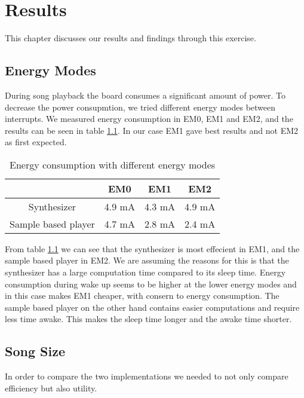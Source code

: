 \chapter{Results}

This chapter discusses our results and findings through this exercise. 


\section{Energy Modes}
\label{sec:energyModeResults}
During song playback the board consumes a significant amount of power. To decrease the power consupmtion, we tried different energy modes between interrupts. We measured energy consumption in EM0, EM1 and EM2, and the results can be seen in table \ref{tab:benchmarkEnergyModes}. In our case EM1 gave best results and not EM2 as first expected.

\begin{table}[H]
	\begin{center}
	\begin{tabular}{ |c|c|c|c| }
	  \hline
	  & EM0 & EM1 & EM2 \\
	  \hline
	  Synthesizer & 4.9 mA & 4.3 mA & 4.9 mA \\
	  \hline
	  Sample based player & 4.7 mA & 2.8 mA & 2.4 mA \\
	  \hline

	\end{tabular}
	\caption{Energy consumption with different energy modes}
	\label{tab:benchmarkEnergyModes}
	\end{center}
\end{table}

From table \ref{tab:benchmarkEnergyModes} we can see that the synthesizer is most effecient in EM1, and the sample based player in EM2. We are assuming the reasons for this is that the synthesizer has a large computation time compared to its sleep time. Energy consumption during wake up seems to be higher at the lower energy modes and in this case makes EM1 cheaper, with consern to energy consumption. The sample based player on the other hand contains easier computations and require less time awake. This makes the sleep time longer and the awake time shorter. 

\section{Song Size}
In order to compare the two implementations we needed to not only compare efficiency but also utility. 

